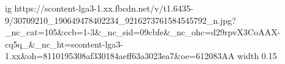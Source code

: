  
 
 
 
 

\par
\ifcmt
  ig https://scontent-lga3-1.xx.fbcdn.net/v/t1.6435-9/30709210_190649478402234_9216273761584545792_n.jpg?_nc_cat=105&ccb=1-3&_nc_sid=09cbfe&_nc_ohc=d29rpvX3CoAAX-cq5q_&_nc_ht=scontent-lga3-1.xx&oh=8110195308af330184aeff63a3023ea7&oe=612083AA
  width 0.15
\fi

